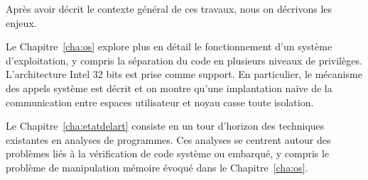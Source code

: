 \begin{headingpage}

Après avoir décrit le contexte général de ces travaux, nous on décrivons les
enjeux.

Le Chapitre~\ref{cha:os} explore plus en détail le fonctionnement d'un système
d'exploitation, y compris la séparation du code en plusieurs niveaux de
privilèges. L'architecture Intel 32 bits est prise comme support. En
particulier, le mécanisme des appels système est décrit et on montre qu'une
implantation naïve de la communication entre espaces utilisateur et noyau casse
toute isolation.

Le Chapitre~\ref{cha:etatdelart} consiste en un tour d'horizon des techniques
existantes en analyses de programmes. Ces analyses se centrent autour des
problèmes liés à la vérification de code système ou embarqué, y compris le
problème de manipulation mémoire évoqué dans le Chapitre~\ref{cha:os}.

\end{headingpage}
